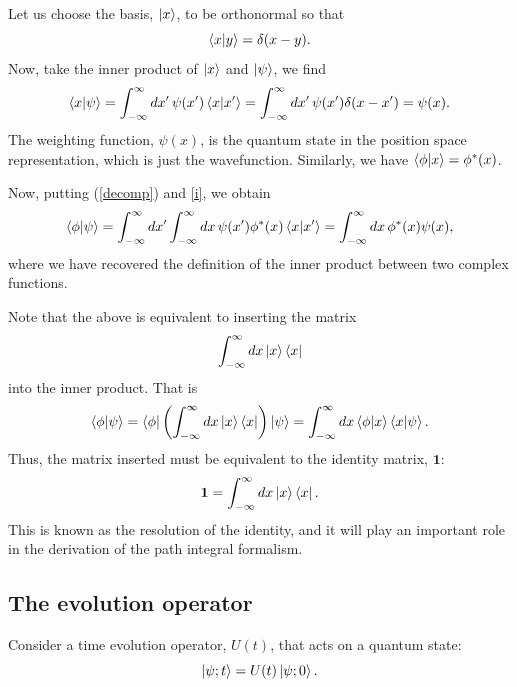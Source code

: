 \documentclass[12pt,a4paper]{article}
\begin{document}
Let us choose the basis, $\ket{x}$, to be orthonormal so that
\begin{equation}
    \braket{x}{y} = \delta(x-y).
\end{equation}
Now, take the inner product of $\ket{x}$ and $\ket{\psi}$, we find
\begin{equation}
    \braket{x}{\psi} = \int^\infty_{-\infty}dx'\,\psi(x')\braket{x}{x'} = \int^\infty_{-\infty}dx'\,\psi(x')\delta(x-x') = \psi(x).
\end{equation}
The weighting function, $\psi(x)$, is the quantum state in the position space representation, which is just the wavefunction. Similarly, we have $\braket{\phi}{x} = \phi^*(x)$. 

Now, putting (\ref{decomp}) and \ref{i}, we obtain
\begin{equation}
    \braket{\phi}{\psi} = \int^\infty_{-\infty}dx'\int^\infty_{-\infty}dx\,\psi(x')\phi^*(x)\braket{x}{x'}  = \int^\infty_{-\infty}dx\,\phi^*(x)\psi(x),
\end{equation}
where we have recovered the definition of the inner product between two complex functions.

Note that the above is equivalent to inserting the matrix 
\begin{equation}
    \int^\infty_{-\infty}dx\ket{x}\bra{x}
\end{equation}
into the inner product. That is
\begin{equation}
    \braket{\phi}{\psi} = \bra{\phi}\left(\int^\infty_{-\infty}dx\ket{x}\bra{x}\right)\ket{\psi} = \int^\infty_{-\infty}dx\braket{\phi}{x}\braket{x}{\psi}.
\end{equation}
Thus, the matrix inserted must be equivalent to the identity matrix, $\mathbf{1}$:
\begin{equation}
    \mathbf{1} = \int^\infty_{-\infty}dx\ket{x}\bra{x}.
    \label{identity}
\end{equation}
This is known as the resolution of the identity, and it will play an important role in the derivation of the path integral formalism.

\subsection{The evolution operator}
\label{sec:HS}
Consider a time evolution operator, $U(t)$, that acts on a quantum state:
\begin{equation}
    \ket{\psi;t} = U(t)\ket{\psi;0}.
\end{equation}
\end{document}
